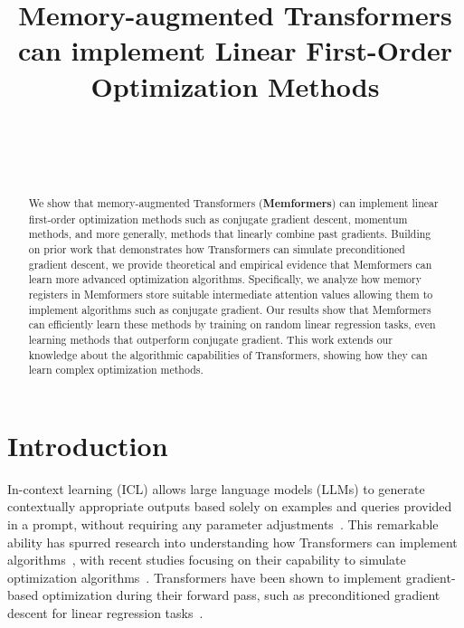 \documentclass[11pt]{article}
\numberwithin{equation}{section}
\begin{document}
\title{Memory-augmented Transformers can implement Linear First-Order Optimization Methods}

\author{\\
\\
 \\
}

\maketitle

\begin{abstract}
We show that memory-augmented Transformers (\textbf{Memformers}) can implement linear first-order optimization methods such as conjugate gradient descent, momentum methods, and more generally, methods that linearly combine past gradients. Building on prior work that demonstrates how Transformers can simulate preconditioned gradient descent, we provide theoretical and empirical evidence that Memformers can learn more advanced optimization algorithms. Specifically, we analyze how memory registers in Memformers store suitable intermediate attention values allowing them to implement algorithms such as conjugate gradient. Our results show that Memformers can efficiently learn these methods by training on random linear regression tasks, even learning methods that outperform conjugate gradient. This work extends our knowledge about the algorithmic capabilities of Transformers, showing how they can learn complex optimization methods.
\end{abstract}

\section{Introduction}
\label{Sect:Introduction}

In-context learning (ICL) allows large language models (LLMs) to generate contextually appropriate outputs based solely on examples and queries provided in a prompt, without requiring any parameter adjustments~\citep{brown2020language, liu2021makes, lu2021fantastically, wei2022chain, wu2022self}. This remarkable ability has spurred research into understanding how Transformers can implement algorithms~\citep{achiam2023gpt, touvron2023llama}, with recent studies focusing on their capability to simulate optimization algorithms~\citep{dai2022can, von2023transformers, garg2022can, akyurek2022learning}. Transformers have been shown to implement gradient-based optimization during their forward pass, such as preconditioned gradient descent for linear regression tasks~\citep{dai2022can, mahankali2023one, ahn2024transformers}.
\end{document}
